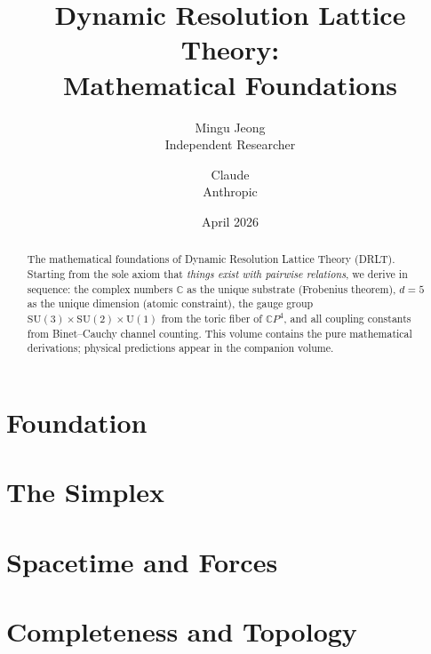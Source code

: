 \documentclass[12pt]{article}
\title{Dynamic Resolution Lattice Theory:\\[6pt]
\large Mathematical Foundations}
\author{Mingu Jeong\\Independent Researcher
\and Claude\\Anthropic}
\date{April 2026}
\theoremstyle{remark}
\theoremstyle{definition}
\newcommand{\CP}{\mathbb{C}P}
\newcommand{\CC}{\mathbb{C}}
\begin{document}
\maketitle

\begin{abstract}
The mathematical foundations of Dynamic Resolution Lattice Theory (DRLT).
Starting from the sole axiom that \emph{things exist with pairwise relations},
we derive in sequence: the complex numbers $\CC$ as the unique substrate
(Frobenius theorem), $d = 5$ as the unique dimension (atomic constraint),
the gauge group $\mathrm{SU}(3)\times\mathrm{SU}(2)\times\mathrm{U}(1)$
from the toric fiber of $\CP^4$, and all coupling constants from
Binet--Cauchy channel counting.  This volume contains the pure mathematical
derivations; physical predictions appear in the companion volume.
\end{abstract}

\tableofcontents
\newpage

\part{Foundation}





\part{The Simplex}




\part{Spacetime and Forces}





\part{Completeness and Topology}
\end{document}
